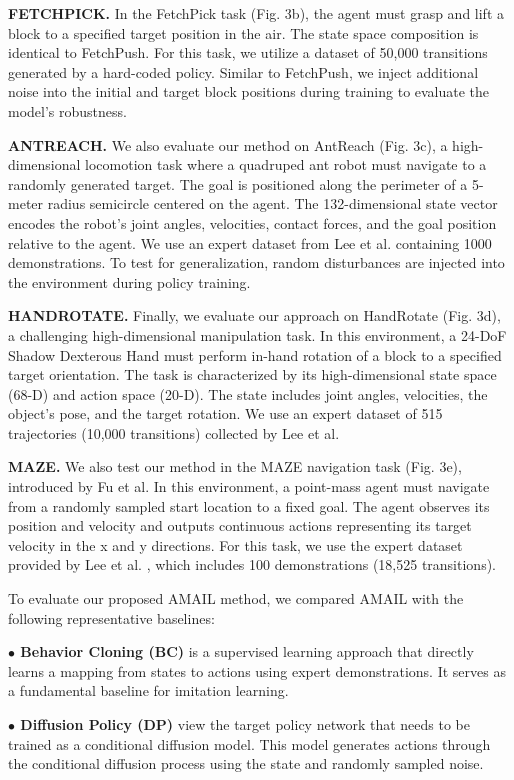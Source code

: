 \documentclass[lettersize,journal]{IEEEtran}
\begin{document}
\textbf{FETCHPICK.} In the FetchPick task (Fig. 3b), the agent must grasp and lift a block to a specified target position in the air. The state space composition is identical to FetchPush. For this task, we utilize a dataset of 50,000 transitions generated by a hard-coded policy. Similar to FetchPush, we inject additional noise into the initial and target block positions during training to evaluate the model's robustness.

\textbf{ANTREACH.} We also evaluate our method on AntReach (Fig. 3c), a high-dimensional locomotion task where a quadruped ant robot must navigate to a randomly generated target. The goal is positioned along the perimeter of a 5-meter radius semicircle centered on the agent. The 132-dimensional state vector encodes the robot's joint angles, velocities, contact forces, and the goal position relative to the agent. We use an expert dataset from Lee et al. containing 1000 demonstrations. To test for generalization, random disturbances are injected into the environment during policy training.

\textbf{HANDROTATE.} Finally, we evaluate our approach on HandRotate (Fig. 3d), a challenging high-dimensional manipulation task. In this environment, a 24-DoF Shadow Dexterous Hand must perform in-hand rotation of a block to a specified target orientation. The task is characterized by its high-dimensional state space (68-D) and action space (20-D). The state includes joint angles, velocities, the object's pose, and the target rotation. We use an expert dataset of 515 trajectories (10,000 transitions) collected by Lee et al.

\textbf{MAZE.} We also test our method in the MAZE navigation task (Fig. 3e), introduced by Fu et al. In this environment, a point-mass agent must navigate from a randomly sampled start location to a fixed goal. The agent observes its position and velocity and outputs continuous actions representing its target velocity in the x and y directions. For this task, we use the expert dataset provided by Lee et al. , which includes 100 demonstrations (18,525 transitions).

To evaluate our proposed AMAIL method, we compared AMAIL with the following representative baselines:

\textbf{$\bullet$ Behavior Cloning (BC)} is a supervised learning approach that directly learns a mapping from states to actions using expert demonstrations. It serves as a fundamental baseline for imitation learning.

\textbf{$\bullet$ Diffusion Policy (DP)} view the target policy network that needs to be trained as a conditional diffusion model. This model generates actions through the conditional diffusion process using the state and randomly sampled noise.
\end{document}
